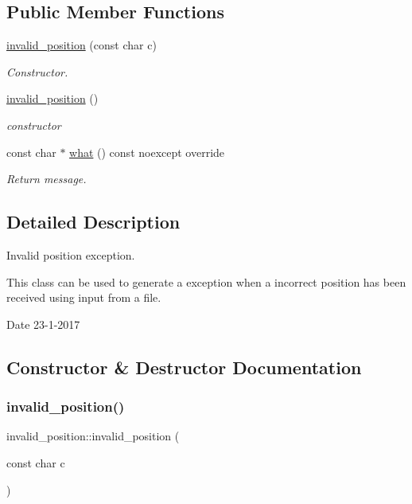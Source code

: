 \subsection*{Public Member Functions}
\begin{DoxyCompactItemize}
\item 
\hyperlink{classinvalid__position_a3d39f52e55d28fe6e9b4af02b7c6f278}{invalid\+\_\+position} (const char c)
\begin{DoxyCompactList}\small\item\em Constructor. \end{DoxyCompactList}\item 
\hyperlink{classinvalid__position_aabeae0fae84fada6af68ff83a68c6542}{invalid\+\_\+position} ()
\begin{DoxyCompactList}\small\item\em constructor \end{DoxyCompactList}\item 
const char $\ast$ \hyperlink{classinvalid__position_a7de16130368fed8546deef6713025cfa}{what} () const noexcept override
\begin{DoxyCompactList}\small\item\em Return message. \end{DoxyCompactList}\end{DoxyCompactItemize}


\subsection{Detailed Description}
Invalid position exception. 

This class can be used to generate a exception when a incorrect position has been received using input from a file.

\begin{DoxyDate}{Date}
23-\/1-\/2017 
\end{DoxyDate}


\subsection{Constructor \& Destructor Documentation}
\mbox{\label{classinvalid__position_a3d39f52e55d28fe6e9b4af02b7c6f278}} 
\subsubsection{\texorpdfstring{invalid\+\_\+position()}{invalid\_position()}\hspace{0.1cm}{\footnotesize\ttfamily [1/2]}}
{\footnotesize\ttfamily invalid\+\_\+position\+::invalid\+\_\+position (\begin{DoxyParamCaption}\item[{const char}]{c }\end{DoxyParamCaption})\hspace{0.3cm}{\ttfamily [inline]}}



